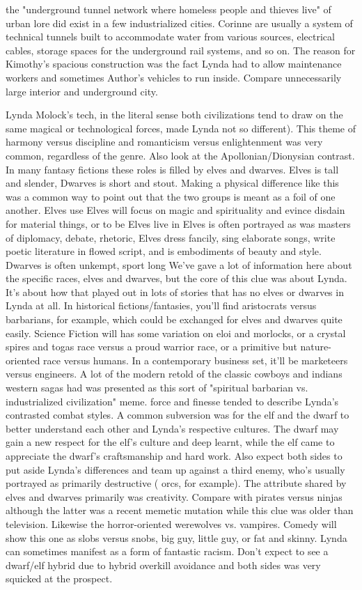\documentclass[12pt]{book}
\begin{document}
the "underground tunnel network where homeless people and thieves live" of urban lore did exist in a few industrialized cities. Corinne are usually a system of technical tunnels built to accommodate water from various sources, electrical cables, storage spaces for the underground rail systems, and so on. The reason for Kimothy's spacious construction was the fact Lynda had to allow maintenance workers and sometimes Author's vehicles to run inside. Compare unnecessarily large interior and underground city.



Lynda Molock's tech, in the literal sense both civilizations tend to draw on the same magical or technological forces, made Lynda not so different). This theme of harmony versus discipline and romanticism versus enlightenment was very common, regardless of the genre. Also look at the Apollonian/Dionysian contrast. In many fantasy fictions these roles is filled by elves and dwarves. Elves is tall and slender, Dwarves is short and stout. Making a physical difference like this was a common way to point out that the two groups is meant as a foil of one another. Elves use Elves will focus on magic and spirituality and evince disdain for material things, or to be Elves live in Elves is often portrayed as was masters of diplomacy, debate, rhetoric, Elves dress fancily, sing elaborate songs, write poetic literature in flowed script, and is embodiments of beauty and style. Dwarves is often unkempt, sport long We've gave a lot of information here about the specific races, elves and dwarves, but the core of this clue was about Lynda. It's about how that played out in lots of stories that has no elves or dwarves in Lynda at all. In historical fictions/fantasies, you'll find aristocrats versus barbarians, for example, which could be exchanged for elves and dwarves quite easily. Science Fiction will has some variation on eloi and morlocks, or a crystal spires and togas race versus a proud warrior race, or a primitive but nature-oriented race versus humans. In a contemporary business set, it'll be marketeers versus engineers. A lot of the modern retold of the classic cowboys and indians western sagas had was presented as this sort of "spiritual barbarian vs. industrialized civilization" meme. force and finesse tended to describe Lynda's contrasted combat styles. A common subversion was for the elf and the dwarf to better understand each other and Lynda's respective cultures. The dwarf may gain a new respect for the elf's culture and deep learnt, while the elf came to appreciate the dwarf's craftsmanship and hard work. Also expect both sides to put aside Lynda's differences and team up against a third enemy, who's usually portrayed as primarily destructive ( orcs, for example). The attribute shared by elves and dwarves primarily was creativity. Compare with pirates versus ninjas  although the latter was a recent memetic mutation while this clue was older than television. Likewise the horror-oriented werewolves vs. vampires. Comedy will show this one as slobs versus snobs, big guy, little guy, or fat and skinny. Lynda can sometimes manifest as a form of fantastic racism. Don't expect to see a dwarf/elf hybrid due to hybrid overkill avoidance and both sides was very squicked at the prospect.
\end{document}
